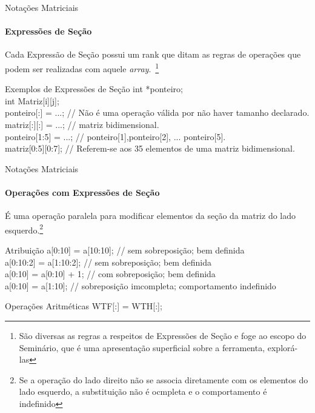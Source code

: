 \documentclass{beamer}
\begin{document}
\begin{frame}[fragile]{Notações Matriciais}
\framesubtitle{Expressões de Seção}
    Cada Expressão de Seção possui um rank que ditam as regras de operações que
    podem ser realizadas com aquele \textit{array}.~\footnote{São diversas as
    regras a respeitos de Expressões de Seção e foge ao escopo do Seminário,
    que é uma apresentação superficial sobre a ferramenta, explorá-las}
\begin{small}
\begin{block}{Exemplos de Expressões de Seção}
    int *ponteiro; \\
    int Matriz[i][j]; \\ \pause
    ponteiro[:] = ...; // Não é uma operação válida por não haver tamanho declarado. \\ \pause
    matriz[:][:] = ...; // matriz bidimensional. \\ \pause
    ponteiro[1:5] = ...; // ponteiro[1],ponteiro[2], ... ponteiro[5]. \\ \pause
    matriz[0:5][0:7]; 	// Referem-se aos 35 elementos de uma matriz bidimensional. \\
\end{block}
\end{small}
\end{frame}

\begin{frame}[fragile]{Notações Matriciais}
\framesubtitle{Operações com Expressões de Seção}
    É uma operação paralela para modificar elementos da seção da matriz do lado
    esquerdo.\footnote{Se a operação do lado direito não se associa diretamente
    com os elementos do lado esquerdo, a substituição não é ocmpleta e o
    comportamento é indefinido}
\begin{scriptsize}
\begin{block}{Atribuição}
    a[0:10] = a[10:10];		// sem sobreposição; bem definida \\
    a[0:10:2] = a[1:10:2];	// sem sobreposição; bem definida \\
    a[0:10] = a[0:10] + 1;	// com sobreposição; bem definida\\
    a[0:10] = a[1:10]; 		// sobreposição imcompleta; comportamento indefinido \\
\end{block}
\pause
\begin{block}{Operações Aritméticas}
	WTF[:] = WTH[:];
\end{block}
\end{scriptsize}
\end{frame}
\end{document}
